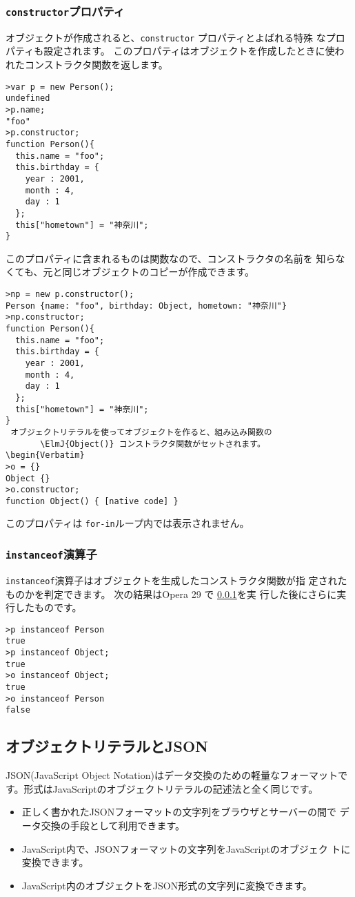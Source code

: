 \subsubsection{\protect\texttt{constructor}プロパティ}\label{constructorProp}
オブジェクトが作成されると、\verb+constructor+ プロパティとよばれる特殊
なプロパティも設定されます。
このプロパティはオブジェクトを作成したときに使われたコンストラクタ関数を返します。

\begin{Verbatim}
>var p = new Person();
undefined
>p.name;
"foo"
>p.constructor;
function Person(){
  this.name = "foo";
  this.birthday = {
    year : 2001,
    month : 4,
    day : 1
  };
  this["hometown"] = "神奈川";
}
\end{Verbatim}

このプロパティに含まれるものは関数なので、コンストラクタの名前を
       知らなくても、元と同じオブジェクトのコピーが作成できます。
\begin{Verbatim}
>np = new p.constructor();
Person {name: "foo", birthday: Object, hometown: "神奈川"}
>np.constructor;
function Person(){
  this.name = "foo";
  this.birthday = {
    year : 2001,
    month : 4,
    day : 1
  };
  this["hometown"] = "神奈川";
}
 オブジェクトリテラルを使ってオブジェクトを作ると、組み込み関数の
       \ElmJ{Object()} コンストラクタ関数がセットされます。
\begin{Verbatim}
>o = {}
Object {}
>o.constructor;
function Object() { [native code] }
\end{Verbatim}
 このプロパティは \verb+for-in+ループ内では表示されません。

\subsubsection{\protect\texttt{instanceof}演算子}
\texttt{instanceof}演算子はオブジェクトを生成したコンストラクタ関数が指
定されたものかを判定できます。
次の結果はOpera 29 で %
\ref{constructorProp}を実
 行した後にさらに実行したものです。
\begin{Verbatim}
>p instanceof Person
true
>p instanceof Object;
true
>o instanceof Object;
true
>o instanceof Person
false
\end{Verbatim}

\subsection{オブジェクトリテラルとJSON}
JSON(JavaScript Object Notation)はデータ交換のための軽量なフォーマットで
す。形式はJavaScriptのオブジェクトリテラルの記述法と全く同じです。
\begin{itemize}
 \item 正しく書かれたJSONフォーマットの文字列をブラウザとサーバーの間で
       データ交換の手段として利用できます。
 \item JavaScript内で、JSONフォーマットの文字列をJavaScriptのオブジェク
       トに変換できます。
 \item JavaScript内のオブジェクトをJSON形式の文字列に変換できます。
\end{itemize}

